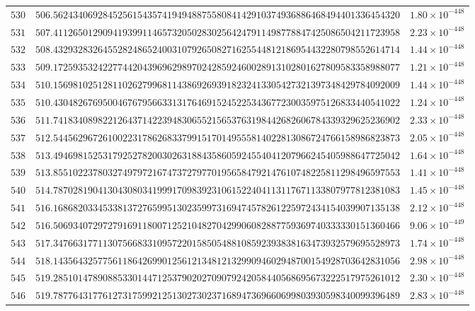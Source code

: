 \documentclass[12pt,reqno]{amsart}
\theoremstyle{remark}
\begin{document}
\begin{longtable}{clc}
$530$ & $506.5624340692845256154357419494887558084142910374936886468494401336454320$ & $1.80\times 10^{-448}$ \\
$531$ & $507.4112650129094193991146573205028302564247911498778847425086504211723958$ & $2.23\times 10^{-448}$ \\
$532$ & $508.4329328326455282486524003107926508271625544812186954432280798552614714$ & $1.44\times 10^{-448}$ \\
$533$ & $509.1725935324227744204396962989702428592460028913102801627809583358988077$ & $1.21\times 10^{-448}$ \\
$534$ & $510.1569810251281102627996811438692693918232413305427321397348429784092009$ & $1.44\times 10^{-448}$ \\
$535$ & $510.4304826769500467679566331317646915245225343677230035975126833440541022$ & $1.24\times 10^{-448}$ \\
$536$ & $511.7418340898221264371422394830655215653763198442682606784339329625236902$ & $2.33\times 10^{-448}$ \\
$537$ & $512.5445629672610022317862683379915170149555814022813086724766158986823873$ & $2.05\times 10^{-448}$ \\
$538$ & $513.4946981525317925278200302631884358605924554041207966245405988647725042$ & $1.64\times 10^{-448}$ \\
$539$ & $513.8551022378032749797216747372797701956584792147610748225811298496597553$ & $1.41\times 10^{-448}$ \\
$540$ & $514.7870281904130430803419991709839231061522404113117671133807977812381083$ & $1.45\times 10^{-448}$ \\
$541$ & $516.1686820334533813727659951302359973169474578261225972434154039907135138$ & $2.12\times 10^{-448}$ \\
$542$ & $516.5069340729727916911800712521048270429906082887759369740333330151360466$ & $9.06\times 10^{-449}$ \\
$543$ & $517.3476631771130756683310957220158505488108592393838163473932579695528973$ & $1.74\times 10^{-448}$ \\
$544$ & $518.1435643257756118642699012561213481213299094602948700154928703642831056$ & $2.98\times 10^{-448}$ \\
$545$ & $519.2851014789088533014471253790202709079242058440568695673222517975261012$ & $2.30\times 10^{-448}$ \\
$546$ & $519.7877643177612731759921251302730237168947369660699803930598340099396489$ & $2.83\times 10^{-448}$ \\

\end{longtable}
\end{document}
